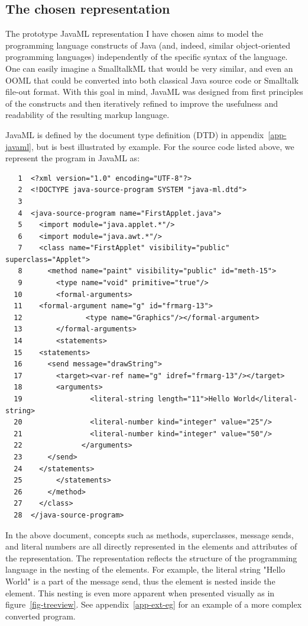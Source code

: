 \documentclass{article}
\begin{document}
\subsection{The chosen representation}

The prototype JavaML representation I have chosen aims to model the
programming language constructs of Java (and, indeed, similar
object-oriented programming languages) independently of the specific
syntax of the language.  One can easily imagine a SmalltalkML that would 
be very similar, and even an OOML that could be converted into 
both classical Java source code or Smalltalk file-out format.  With this goal in mind,
JavaML was designed from first principles of the constructs and then
iteratively refined to improve the usefulness
and readability of the resulting markup language.  

JavaML is defined by the document type definition (DTD) in
appendix~\ref{app-javaml}, but is best illustrated by example. 
For the  source code listed above, we represent 
the program in JavaML as:

\begin{verbatim}
   1  <?xml version="1.0" encoding="UTF-8"?>
   2  <!DOCTYPE java-source-program SYSTEM "java-ml.dtd">
   3  
   4  <java-source-program name="FirstApplet.java">
   5    <import module="java.applet.*"/>
   6    <import module="java.awt.*"/>
   7    <class name="FirstApplet" visibility="public" superclass="Applet">
   8      <method name="paint" visibility="public" id="meth-15">
   9        <type name="void" primitive="true"/>
  10        <formal-arguments>
  11    <formal-argument name="g" id="frmarg-13">
  12               <type name="Graphics"/></formal-argument>
  13        </formal-arguments>
  14        <statements>
  15    <statements>
  16      <send message="drawString">
  17        <target><var-ref name="g" idref="frmarg-13"/></target>
  18        <arguments>
  19                <literal-string length="11">Hello World</literal-string>
  20                <literal-number kind="integer" value="25"/>
  21                <literal-number kind="integer" value="50"/>
  22              </arguments>
  23      </send>
  24    </statements>
  25        </statements>
  26      </method>
  27    </class>
  28  </java-source-program>
\end{verbatim}

In the above document, concepts such as methods, superclasses, message sends, and
literal numbers are all directly represented in the elements and
attributes of the representation.  The representation reflects the 
structure of the programming language in the nesting of the elements.  
For example, the literal
string "Hello World" is a part of the message send, thus the
 element is nested inside the
 element.  This nesting is even more apparent
when presented visually as in figure~\ref{fig-treeview}. See
appendix~\ref{app-ext-eg} for an
example of a more complex converted program.
\end{document}
